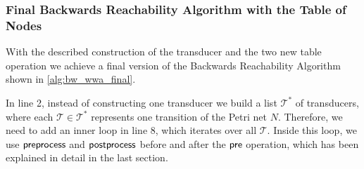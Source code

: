 %
%
%
%
%
%

\subsubsection{Final Backwards Reachability Algorithm with the Table of Nodes}
With the described construction of the transducer and the two new table operation we achieve a final version of the Backwards Reachability Algorithm shown in \autoref{alg:bw_wwa_final}. 

In line 2, instead of constructing one transducer we build a list $\mathcal{T}^{*}$ of transducers, where each $\mathcal{T} \in \mathcal{T}^{*}$ represents one transition of the Petri net $N$. Therefore, we need to add an inner loop in line 8, which iterates over all $\mathcal{T}$. Inside this loop, we use $\operatorname{\textsf{preprocess}}$ and $\operatorname{\textsf{postprocess}}$ before and after the $\operatorname{\textsf{pre}}$ operation, which has been explained in detail in the last section.


